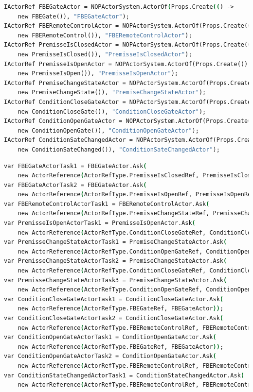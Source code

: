 \begin{lstlisting}[language = csh, caption = {Criação de atores em Akka.NET}, %float=htb,
source = {Adaptado de \citeonline{martini_2019}}, label = {cod:akka_create}, language={csh}]
IActorRef FBEGateActor = NOPActorSystem.ActorOf(Props.Create(() ->
    new FBEGate()), "FBEGateActor");
IActorRef FBERemoteControlActor = NOPActorSystem.ActorOf(Props.Create(() ->
    new FBERemoteControl()), "FBERemoteControlActor");
IActorRef PremisseIsClosedActor = NOPActorSystem.ActorOf(Props.Create(() ->
    new PremisseIsClosed()), "PremisseIsClosedActor");
IActorRef PremisseIsOpenActor = NOPActorSystem.ActorOf(Props.Create(() ->
    new PremisseIsOpen()), "PremisseIsOpenActor");
IActorRef PremiseChangeStateActor = NOPActorSystem.ActorOf(Props.Create(() ->
    new PremiseChangeState()), "PremiseChangeStateActor");
IActorRef ConditionCloseGateActor = NOPActorSystem.ActorOf(Props.Create(() ->
    new ConditionCloseGate()), "ConditionCloseGateActor");
IActorRef ConditionOpenGateActor = NOPActorSystem.ActorOf(Props.Create(() ->
    new ConditionOpenGate()), "ConditionOpenGateActor");
IActorRef ConditionSateChangedActor = NOPActorSystem.ActorOf(Props.Create(() ->
    new ConditionSateChanged()), "ConditionSateChangedActor");
\end{lstlisting}

\begin{lstlisting}[language = csh, caption = {Conexão entre atores em Akka.NET}, %float=htb,
source = {Adaptado de \citeonline{martini_2019}}, label = {cod:akka_link}, language={csh}]
var FBEGateActorTask1 = FBEGateActor.Ask(
    new ActorReference(ActorRefType.PremisseIsClosedRef, PremisseIsClosedActor));
var FBEGateActorTask2 = FBEGateActor.Ask(
    new ActorReference(ActorRefType.PremisseIsOpenRef, PremisseIsOpenRefActor));
var FBERemoteControlActorTask1 = FBERemoteControlActor.Ask(
    new ActorReference(ActorRefType.PremisseChangeStateRef, PremisseChangeStateActor));
var PremisseIsOpenActorTask1 = PremisseIsOpenActor.Ask(
    new ActorReference(ActorRefType.ConditionCloseGateRef, ConditionCloseGateActor));
var PremisseChangeStateActorTask1 = PremiseChangeStateActor.Ask(
    new ActorReference(ActorRefType.ConditionOpenGateRef, ConditionOpenGateActor));
var PremisseChangeStateActorTask2 = PremiseChangeStateActor.Ask(
    new ActorReference(ActorRefType.ConditionCloseGateRef, ConditionCloseGateActor));
var PremisseChangeStateActorTask3 = PremiseChangeStateActor.Ask(
    new ActorReference(ActorRefType.ConditionOpenGateRef, ConditionOpenGateActor));
var ConditionCloseGateActorTask1 = ConditionCloseGateActor.Ask(
    new ActorReference(ActorRefType.FBEGateRef, FBEGateActor));
var ConditionCloseGateActorTask2 = ConditionCloseGateActor.Ask(
    new ActorReference(ActorRefType.FBERemoteControlRef, FBERemoteControlActor));
var ConditionOpenGateActorTask1 = ConditionOpenGateActor.Ask(
    new ActorReference(ActorRefType.FBEGateRef, FBEGateActor));
var ConditionOpenGateActorTask2 = ConditionOpenGateActor.Ask(
    new ActorReference(ActorRefType.FBERemoteControlRef, FBERemoteControlActor));
var ConditionStateChangedActorTask1 = ConditionStateChangedActor.Ask(
    new ActorReference(ActorRefType.FBERemoteControlRef, FBERemoteControlActor));
\end{lstlisting}

